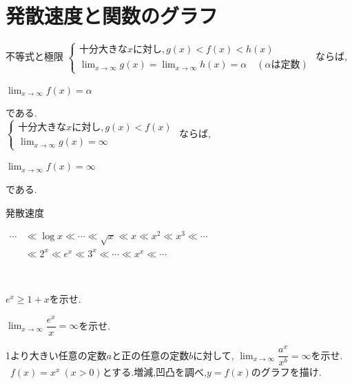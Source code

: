 \documentclass[10pt,fleqn,a4paper]{jsarticle}
\begin{document}
\newpage

\section{発散速度と関数のグラフ}

\begin{itembox}
[l]{\enpitu 不等式と極限}
\noindent\kakkoichi
$
\begin{cases}
十分大きなxに対し,g(x)<f(x)<h(x)\\
\displaystyle\lim_{x\to\infty}g(x)=\lim_{x\to\infty}h(x)=\alpha\quad(\alpha\text{は定数})
\end{cases}
$
ならば,
\begin{center}
$\displaystyle\lim_{x\to\infty}f(x)=\alpha$
\end{center}
である.\\
\noindent\kakkoni
$
\begin{cases}
十分大きなxに対し,g(x)<f(x)\\
\displaystyle\lim_{x\to\infty}g(x)=\infty
\end{cases}
$
ならば,
\begin{center}
$\displaystyle\lim_{x\to\infty}f(x)=\infty$
\end{center}
である.
\end{itembox}

\begin{itembox}
[l]{\enpitu 発散速度}
\begin{center}
$
\begin{aligned}
\cdots&\ll\log x\ll\cdots\ll\sqrt{x}\ll x\ll x^2\ll x^3\ll\cdots\\
&\ll2^x\ll e^x\ll3^x\ll\cdots\ll x^x\ll\cdots
\end{aligned}
$
\end{center}
\end{itembox}

\newpage

\noindent{}\
\par\noindent\kakkoichi $e^x\geq1+x$を示せ.\
\par\noindent\kakkoni $\displaystyle\lim_{x\to\infty}\dfrac{e^x}{x}=\infty$を示せ.\
\par\noindent\kakkosan 1より大きい任意の定数$a$と正の任意の定数$b$に対して,
$\displaystyle\lim_{x\to\infty}\dfrac{a^x}{x^b}=\infty$を示せ.\\

\noindent\ba{2$\bullet$2}\
$f(x)=x^x\ (x>0)$とする.増減,凹凸を調べ,$y=f(x)$のグラフを描け.\\
\end{document}
